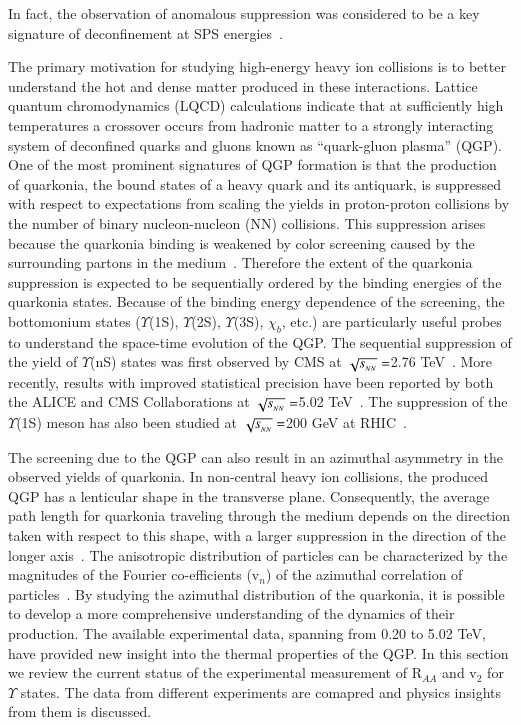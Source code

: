 In fact, the observation of anomalous suppression was considered to be
a key signature of deconfinement at SPS energies~\cite{Kluberg:2005yh}.

The primary motivation for studying high-energy heavy ion collisions is to better understand the hot and dense
matter produced in these interactions. Lattice quantum chromodynamics (LQCD) calculations indicate that at
sufficiently high temperatures a crossover occurs from hadronic matter to a strongly interacting system
of deconfined quarks and gluons known as ``quark-gluon plasma'' (QGP). One of the most prominent signatures of QGP
formation is that the production of quarkonia, the bound states of a heavy quark and its antiquark, is suppressed
with respect to expectations from scaling the yields in proton-proton collisions by the number of binary nucleon-nucleon
(NN) collisions. This suppression arises because the quarkonia binding is weakened by color screening caused by
the surrounding partons in the medium~\cite{Matsui:1986dk}. Therefore the extent of the quarkonia suppression is
expected to be sequentially ordered by the binding energies of the quarkonia states. Because of the binding energy
dependence of the screening, the bottomonium states ($\Upsilon$(1S), $\Upsilon$(2S),
$\Upsilon$(3S), $\chi_{b}$, etc.) are particularly useful probes to understand the space-time evolution
of the QGP. The sequential suppression of the yield of $\Upsilon$(nS) states was first observed by
CMS at $\sqrt{s_{_{NN}}} =$2.76 TeV~\cite{Chatrchyan:2011pe,Chatrchyan:2012lxa}. More recently, results with improved
statistical precision have been reported by both the ALICE and CMS Collaborations at $\sqrt{s_{_{NN}}} =$5.02
TeV~\cite{ALICE:2018wzm,Sirunyan:2018nsz,Sirunyan:2017lzi}. The suppression of the $\Upsilon$(1S)
meson has also been studied at $\sqrt{s_{_{NN}}} =$200 GeV at RHIC~\cite{STAR:2013kwk}.

The screening due to the QGP can also result in an azimuthal asymmetry in the observed yields of quarkonia. In non-central
heavy ion collisions, the produced QGP has a lenticular shape in the transverse plane. Consequently, the average path length
for quarkonia traveling through the medium depends on the direction taken with respect to this shape, with a larger suppression
in the direction of the longer axis~\cite{He:2015hfa}. The anisotropic distribution of particles can be characterized by the magnitudes
of the Fourier co-efficients (v$_{n}$) of the azimuthal correlation of particles~\cite{Voloshin:1994mz}. By studying the
azimuthal distribution of the quarkonia, it is possible to develop a more comprehensive understanding of the dynamics of their
production. The available experimental data, spanning from 0.20 to 5.02 TeV, have provided new insight into the thermal properties
of the QGP. In this section we review the current status of the experimental measurement of R$_{AA}$ and v$_{2}$ for
$\Upsilon$ states. The data from different experiments are comapred and physics insights from them is discussed.   






